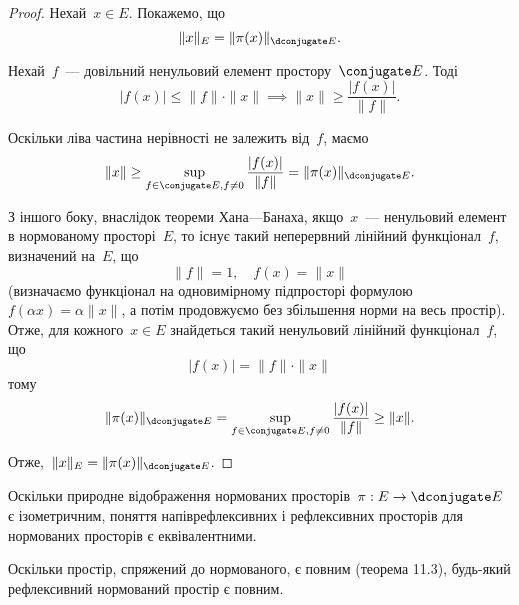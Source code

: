 \begin{proof}
    Нехай~$x \in E$. Покажемо, що
    \begin{equation*}
        \|x\|_E = \|\pi(x)\|_{\dconjugate E}.
    \end{equation*}
    
    Нехай~$f$~--- довільний ненульовий елемент простору~$\conjugate E$. Тоді
    \begin{equation*}
        |f(x)| \le \|f\| \cdot \|x\| \implies \|x\| \ge \frac{|f(x)|}{\|f\|}.
    \end{equation*}
    
    Оскільки ліва частина нерівності не залежить від~$f$, маємо
    \begin{equation*}
        \|x\| \ge \sup_{f \in \conjugate E, f \ne 0} \frac{|f(x)|}{\|f\|} =
        \|\pi(x)\|_{\dconjugate E}.
    \end{equation*}
     
    З іншого боку, внаслідок теореми Хана---Банаха, якщо~$x$~--- ненульовий елемент в нормованому просторі~$E$, то існує такий неперервний лінійний функціонал~$f$, визначений на~$E$, що
    \begin{equation*}
        \|f\| = 1, \quad f(x) = \|x\|
    \end{equation*}
    (визначаємо функціонал на одновимірному підпросторі формулою~$f(\alpha x) = \alpha \|x\|$, а потім продовжуємо без збільшення норми на весь простір). Отже, для кожного~$x \in E$ знайдеться такий ненульовий лінійний функціонал~$f$, що
    \begin{equation*}
        |f(x)| = \|f\| \cdot \|x\|
    \end{equation*}
    тому
    \begin{equation*}
        \|\pi(x)\|_{\dconjugate E} = \sup_{f \in \conjugate E, f \ne 0} \frac{|f(x)|}{\|f\|} \ge \|x\|.
    \end{equation*}
    
    Отже,~$\|x\|_E = \|\pi(x)\|_{\dconjugate E}$.
\end{proof}

\begin{remark}
    Оскільки природне відображення нормованих просторів~$\pi: E \to \dconjugate E$ є ізометричним, поняття напіврефлексивних і рефлексивних просторів для нормованих просторів є еквівалентними.
\end{remark}

\begin{remark}
    Оскільки простір, спряжений до нормованого, є повним \error (теорема 11.3), будь-який рефлексивний нормований простір є повним.
\end{remark}

